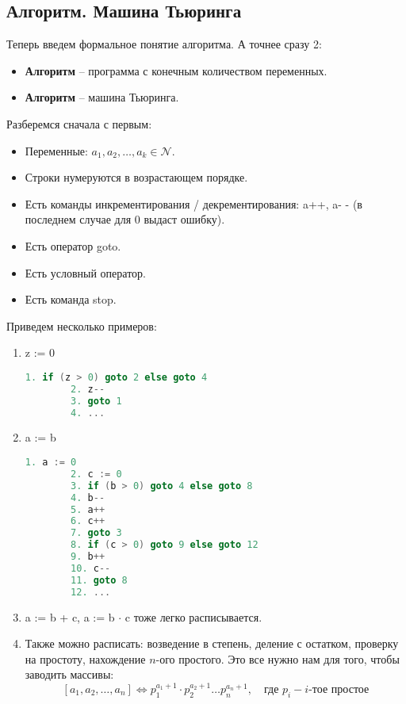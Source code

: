 \vspace{5mm}

\subsection{Алгоритм. Машина Тьюринга}

Теперь введем формальное понятие алгоритма. А точнее сразу 2: \begin{itemize}
    \item \textbf{Алгоритм} -- программа с конечным количеством переменных.
    \item \textbf{Алгоритм} -- машина Тьюринга.
\end{itemize}
Разберемся сначала с первым: \begin{itemize}
    \item Переменные: $a_1, a_2, \dots, a_k \in \mathcal{N}$.
    \item Строки нумеруются в возрастающем порядке.
    \item Есть команды инкрементирования / декрементирования: a++, a- - (в последнем случае для 0 выдаст ошибку).
    \item Есть оператор goto.
    \item Есть условный оператор.
    \item Есть команда stop.
\end{itemize}
Приведем несколько примеров: \begin{enumerate}
    \item z := 0 \begin{lstlisting}[language=c++]
        1. if (z > 0) goto 2 else goto 4
        2. z--
        3. goto 1
        4. ...
    \end{lstlisting}
    \item a := b \begin{lstlisting}[language=c++]
        1. a := 0
        2. c := 0
        3. if (b > 0) goto 4 else goto 8
        4. b--
        5. a++
        6. c++
        7. goto 3
        8. if (c > 0) goto 9 else goto 12
        9. b++
        10. c--
        11. goto 8
        12. ... 
    \end{lstlisting}
    \item a := b + c, a := b $\cdot$ c тоже легко расписывается.
    \item Также можно расписать: возведение в степень, деление с остатком, проверку на простоту, нахождение $n$-ого простого. Это все нужно нам для того, чтобы заводить массивы: \[ [a_1, a_2, \dots, a_n]  \Leftrightarrow p_1^{a_1 + 1} \cdot p_2^{a_2 + 1} \dots p_n^{a_n + 1}, \quad \text{где } p_i - \text{$i$-тое простое} \]
\end{enumerate}

